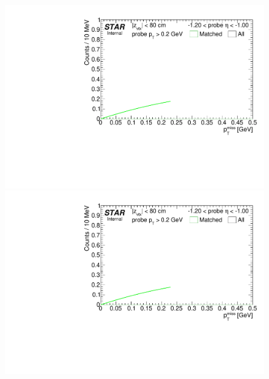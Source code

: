 \begin{figure}[ht]
{  \includegraphics[width=\linewidth,page=9]{graphics/systematicsEfficiency/TOF_tagAndProbe/Fitting_effVsEta_mc.pdf}\\
  \includegraphics[width=\linewidth,page=10]{graphics/systematicsEfficiency/TOF_tagAndProbe/Fitting_effVsEta_mc.pdf}
}%
\end{figure}
